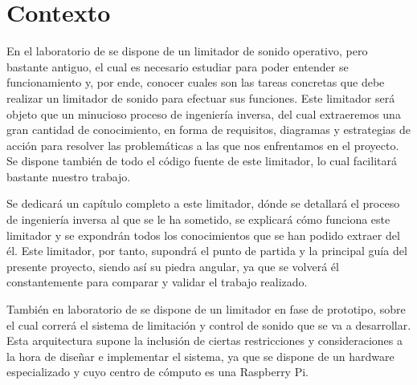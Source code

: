 \section{Contexto} \label{sec:contexto}



En el laboratorio de  se dispone de un limitador de sonido operativo, pero bastante antiguo, el cual es necesario estudiar para poder entender se funcionamiento y, por ende, conocer cuales son las tareas concretas que debe realizar un limitador de sonido para efectuar sus funciones. Este limitador será objeto que un minucioso proceso de ingeniería inversa, del cual extraeremos una gran cantidad de conocimiento, en forma de requisitos, diagramas y estrategias de acción para resolver las problemáticas a las que nos enfrentamos en el proyecto. Se dispone también de todo el código fuente de este limitador, lo cual facilitará bastante nuestro trabajo.

Se dedicará un capítulo completo a este limitador, dónde se detallará el proceso de ingeniería inversa al que se le ha sometido, se explicará cómo funciona este limitador y se expondrán todos los conocimientos que se han podido extraer del él. Este limitador, por tanto, supondrá el punto de partida y la principal guía del presente proyecto, siendo así su piedra angular, ya que se volverá él constantemente para comparar y validar el trabajo realizado.

También en laboratorio de  se dispone de un limitador en fase de prototipo, sobre el cual correrá el sistema de limitación y control de sonido que se va a desarrollar. Esta arquitectura supone la inclusión de ciertas restricciones y consideraciones a la hora de diseñar e implementar el sistema, ya que se dispone de un hardware especializado y cuyo centro de cómputo es una Raspberry Pi.

